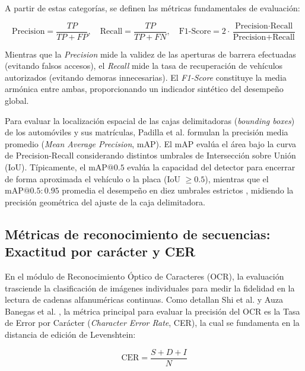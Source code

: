 A partir de estas categorías, se definen las métricas fundamentales de evaluación:

\begin{equation}
    \text{Precision}
    =
    \frac{TP}{TP + FP}, \quad \text{Recall}
    =
    \frac{TP}{TP + FN}, \quad \text{F1-Score}
    =
    2 \cdot \frac{\text{Precision} \cdot \text{Recall}}{\text{Precision} + \text{Recall}}
\end{equation}

Mientras que la \textit{Precision} mide la validez de las aperturas de barrera
efectuadas (evitando falsos accesos), el \textit{Recall} mide la tasa de
recuperación de vehículos autorizados (evitando demoras innecesarias). El
\textit{F1-Score} constituye la media armónica entre ambas, proporcionando un
indicador sintético del desempeño global.

Para evaluar la localización espacial de las cajas delimitadoras
(\textit{bounding boxes}) de los automóviles y sus matrículas, Padilla et al.
\cite{padilla2021metrics} formulan la precisión media promedio 
(\textit{Mean Average Precision}, mAP). El mAP evalúa el área bajo la curva de
Precision-Recall considerando distintos umbrales de Intersección sobre Unión 
(IoU). Típicamente, el $\text{mAP}@0{.}5$ evalúa la capacidad del detector para
encerrar de forma aproximada el vehículo o la placa (IoU $\ge 0{.}5$), mientras que
el $\text{mAP}@0{.}5:0{.}95$ promedia el desempeño en diez umbrales estrictos
\cite{lin2014coco}, midiendo la precisión geométrica del ajuste de la caja delimitadora.

\subsection{Métricas de reconocimiento de secuencias: Exactitud por carácter y CER}

En el módulo de Reconocimiento Óptico de Caracteres (OCR), la evaluación
trasciende la clasificación de imágenes individuales para medir la fidelidad en
la lectura de cadenas alfanuméricas continuas. Como detallan Shi et al.
\cite{shi2017crnn} y Auza Banegas et al. \cite{auzabanegas2026blpr}, la métrica
principal para evaluar la precisión del OCR es la Tasa de Error por Carácter
(\textit{Character Error Rate}, CER), la cual se fundamenta en la distancia de
edición de Levenshtein:

\begin{equation}
    \text{CER} = \frac{S + D + I}{N}
\end{equation}

